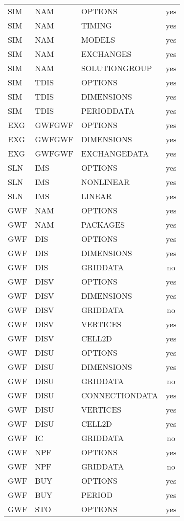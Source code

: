 \begin{longtable}{p{1.5cm} p{1.5cm} p{3cm} c}
\hline
SIM & NAM & OPTIONS & yes \\ 
SIM & NAM & TIMING & yes \\ 
SIM & NAM & MODELS & yes \\ 
SIM & NAM & EXCHANGES & yes \\ 
SIM & NAM & SOLUTIONGROUP & yes \\ 
\hline
SIM & TDIS & OPTIONS & yes \\ 
SIM & TDIS & DIMENSIONS & yes \\ 
SIM & TDIS & PERIODDATA & yes \\ 
\hline
EXG & GWFGWF & OPTIONS & yes \\ 
EXG & GWFGWF & DIMENSIONS & yes \\ 
EXG & GWFGWF & EXCHANGEDATA & yes \\ 
\hline
SLN & IMS & OPTIONS & yes \\ 
SLN & IMS & NONLINEAR & yes \\ 
SLN & IMS & LINEAR & yes \\ 
\hline
GWF & NAM & OPTIONS & yes \\ 
GWF & NAM & PACKAGES & yes \\ 
\hline
GWF & DIS & OPTIONS & yes \\ 
GWF & DIS & DIMENSIONS & yes \\ 
GWF & DIS & GRIDDATA & no \\ 
\hline
GWF & DISV & OPTIONS & yes \\ 
GWF & DISV & DIMENSIONS & yes \\ 
GWF & DISV & GRIDDATA & no \\ 
GWF & DISV & VERTICES & yes \\ 
GWF & DISV & CELL2D & yes \\ 
\hline
GWF & DISU & OPTIONS & yes \\ 
GWF & DISU & DIMENSIONS & yes \\ 
GWF & DISU & GRIDDATA & no \\ 
GWF & DISU & CONNECTIONDATA & yes \\ 
GWF & DISU & VERTICES & yes \\ 
GWF & DISU & CELL2D & yes \\ 
\hline
GWF & IC & GRIDDATA & no \\ 
\hline
GWF & NPF & OPTIONS & yes \\ 
GWF & NPF & GRIDDATA & no \\ 
\hline
GWF & BUY & OPTIONS & yes \\ 
GWF & BUY & PERIOD & yes \\ 
\hline
GWF & STO & OPTIONS & yes \\ 

\end{longtable}

